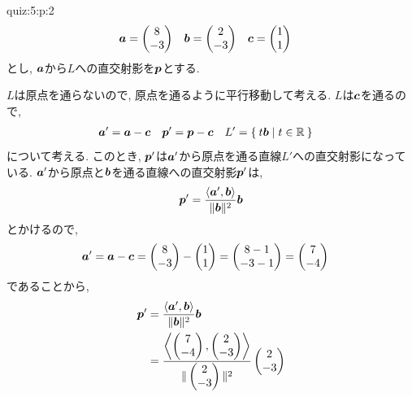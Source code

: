 \begin{answerof}{quiz:5:p:2}
  \begin{align*}
    \boldsymbol{a}&=\begin{pmatrix}8\\-3\end{pmatrix}&
    \boldsymbol{b}&=\begin{pmatrix}2\\-3\end{pmatrix}&
    \boldsymbol{c}&=\begin{pmatrix}1\\1\end{pmatrix}
  \end{align*}
  とし, $\boldsymbol{a}$から$L$への直交射影を$\boldsymbol{p}$とする.
  
  $L$は原点を通らないので, 原点を通るように平行移動して考える.
  $L$は$\boldsymbol{c}$を通るので,
  \begin{align*}
    \boldsymbol{a}'&=\boldsymbol{a}-\boldsymbol{c}&
    \boldsymbol{p}'&=\boldsymbol{p}-\boldsymbol{c}&
    L'&=\Set{t\boldsymbol{b}|t\in\mathbb{R}}
  \end{align*}
  について考える.
  このとき, $\boldsymbol{p}'$は$\boldsymbol{a}'$から原点を通る直線$L'$への直交射影になっている.
  $\boldsymbol{a}'$から原点と$\boldsymbol{b}$を通る直線への直交射影$\boldsymbol{p}'$は,
  \begin{align*}
    \boldsymbol{p}'=\frac{\Braket{\boldsymbol{a}',\boldsymbol{b}}}{\|\boldsymbol{b}\|^2}\boldsymbol{b}
  \end{align*}
  とかけるので,
  \begin{align*}
    \boldsymbol{a}'&=\boldsymbol{a}-\boldsymbol{c}=\begin{pmatrix}8\\-3\end{pmatrix}-\begin{pmatrix}1\\1\end{pmatrix}
    =\begin{pmatrix}8-1\\-3-1\end{pmatrix}=\begin{pmatrix}7\\-4\end{pmatrix}
  \end{align*}
  であることから,
  \begin{align*}
  \pp'&=\frac{\Braket{\aaa',\bbb}}{\|\bbb\|^2}\bbb\\
  &=\frac{\Braket{\begin{pmatrix}7\\-4\end{pmatrix},\begin{pmatrix}2\\-3\end{pmatrix}}}{\|\begin{pmatrix}2\\-3\end{pmatrix}\|^2}\begin{pmatrix}2\\-3\end{pmatrix}\\

\end{align*}
\end{answerof}
